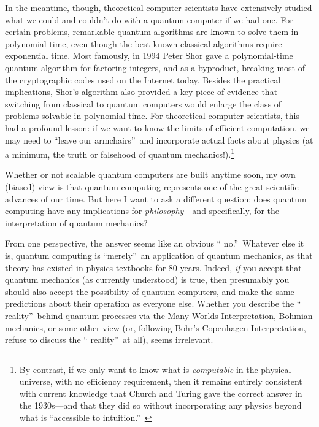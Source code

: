 \documentclass[12pt,onecolumn]{article}%
\begin{document}
In the meantime, though, theoretical computer scientists have extensively
studied what we could and couldn't do with a quantum computer if we had one.
 For certain problems, remarkable quantum algorithms are known to solve them
in polynomial time, even though the best-known classical algorithms require
exponential time. Most famously, in 1994 Peter Shor \cite{shor} gave a
polynomial-time quantum algorithm for factoring integers, and as a byproduct,
breaking most of the cryptographic codes used on the Internet today. Besides
the practical implications, Shor's algorithm also provided a key piece of
evidence that switching from classical to quantum computers would enlarge the
class of problems solvable in polynomial-time. For theoretical computer
scientists, this had a profound lesson: if we want to know the limits of
efficient computation, we may need to \textquotedblleft leave our
armchairs\textquotedblright\  and incorporate actual facts about physics (at a
minimum, the truth or falsehood of quantum mechanics!).\footnote{By contrast,
if we only want to know what is \textit{computable} in the physical universe,
with no efficiency requirement, then it remains entirely consistent with
current knowledge that Church and Turing gave the correct answer in the
1930s---and that they did so without incorporating any physics beyond what is
\textquotedblleft accessible to intuition.\textquotedblright\ }

Whether or not scalable quantum computers are built anytime soon, my own
(biased) view is that quantum computing represents one of the great scientific
advances of our time. But here I want to ask a different question: does
quantum computing have any implications for \textit{philosophy}---and
specifically, for the interpretation of quantum mechanics?

From one perspective, the answer seems like an obvious \textquotedblleft
no.\textquotedblright\  Whatever else it is, quantum computing is
\textquotedblleft merely\textquotedblright\  an application of quantum
mechanics, as that theory has existed in physics textbooks for 80 years.
 Indeed, \textit{if} you accept that quantum mechanics (as currently
understood) is true, then presumably you should also accept the possibility of
quantum computers, and make the same predictions about their operation as
everyone else. Whether you describe the \textquotedblleft
reality\textquotedblright\  behind quantum processes via the Many-Worlds
Interpretation, Bohmian mechanics, or some other view (or, following Bohr's
Copenhagen Interpretation, refuse to discuss the \textquotedblleft
reality\textquotedblright\  at all), seems irrelevant.
\end{document}
